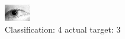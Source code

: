 \begin{figure}[h!]
\begin{center}
\includegraphics[width=0.60\columnwidth]{figures/ID1286_class_4_target_3.png}
\end{center}
\caption{ Classification: 4 actual target: 3}
\label{fig:ID1286_class_4_target_3}
\end{figure}
